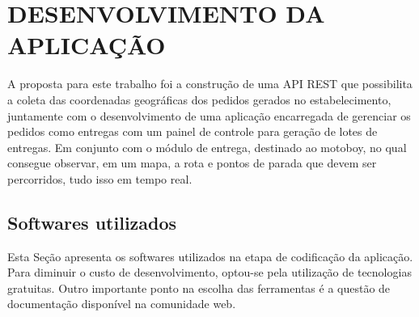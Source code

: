 
\chapter{DESENVOLVIMENTO DA APLICAÇÃO}

A proposta para este trabalho foi a construção de uma API REST que possibilita a coleta das coordenadas geográficas dos pedidos gerados no estabelecimento, juntamente com o desenvolvimento de uma aplicação encarregada de gerenciar os pedidos como entregas com um painel de controle para geração de lotes de entregas. Em conjunto com o módulo de entrega, destinado ao motoboy, no qual consegue observar, em um mapa, a rota e pontos de parada que devem ser percorridos, tudo isso em tempo real.

\section{Softwares utilizados}

Esta Seção apresenta os softwares utilizados na etapa de codificação da aplicação. Para diminuir o custo de desenvolvimento, optou-se pela utilização de tecnologias gratuitas. Outro importante ponto na escolha das ferramentas é a questão de documentação disponível na comunidade web.

